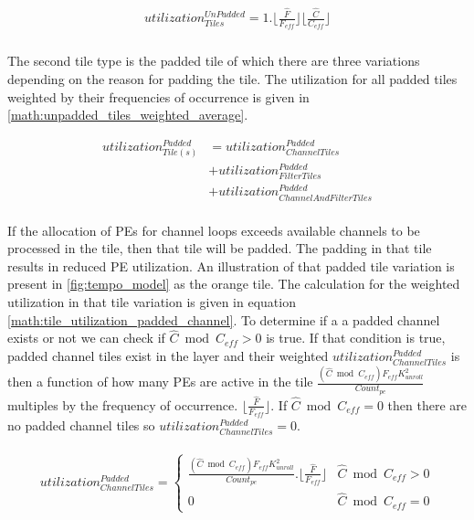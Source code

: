 \begin{align}
    \begin{gathered}
        utilization^{UnPadded}_{Tiles} = 1.\lfloor \frac{\hat{F}}{F_{eff}} \rfloor \lfloor \frac{\hat{C}}{C_{eff}}\rfloor \\
            \end{gathered}
    \label{math:tile_utilization_unpadded}
\end{align}

The second tile type is the padded tile of which there are three variations
depending on the reason for padding the tile. The utilization for all
padded tiles weighted by their frequencies of occurrence is given in
\autoref{math:unpadded_tiles_weighted_average}. 

\begin{equation}
    \begin{aligned}
        utilization^{Padded}_{Tile(s)} & = utilization^{Padded}_{ChannelTiles} \\
                                       & + utilization^{Padded}_{FilterTiles} \\
                                       & + utilization^{Padded}_{ChannelAndFilterTiles} \\
    \end{aligned}
    \label{math:unpadded_tiles_weighted_average}
\end{equation}
  
If the allocation of PEs for channel loops exceeds available channels to be
processed in the tile, then that tile will be padded. The padding in that tile results
in reduced PE utilization. An illustration of that padded tile variation is
present in \autoref{fig:tempo_model} as the orange tile.  The calculation for
the weighted utilization in that tile variation is given in equation
\autoref{math:tile_utilization_padded_channel}. To determine if a a padded channel
exists or not we can check if $\hat{C} \bmod C_{eff} > 0$ is true. If that
condition is true, padded channel tiles exist in the layer and their weighted
$utilization^{Padded}_{ChannelTiles}$ is then a function of how many PEs are
active in the tile $\frac{(\hat{C} \bmod C_{eff}) F_{eff}
K_{unroll}^2}{Count_{pe}}$ multiples by the frequency of occurrence. $\lfloor
\frac{\hat{F}}{F_{eff}} \rfloor$. If $\hat{C} \bmod C_{eff} = 0$ then there are
no padded channel tiles so $utilization^{Padded}_{ChannelTiles} = 0$.

\begin{align}
    \begin{gathered}
        utilization^{Padded}_{ChannelTiles} = \begin{cases} \frac{(\hat{C} \bmod C_{eff}) F_{eff} K_{unroll}^2}{Count_{pe}}.\lfloor \frac{\hat{F}}{F_{eff}} \rfloor
         & \hat{C} \bmod C_{eff} > 0 \\ 0
         & \hat{C} \bmod C_{eff} = 0 \end{cases} \\
            \end{gathered}
    \label{math:tile_utilization_padded_channel}
\end{align}

